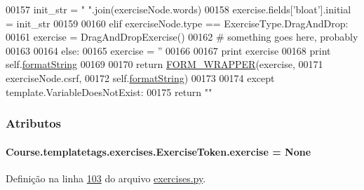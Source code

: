 \begin{DoxyCode}
00157                 init\_str = \textcolor{stringliteral}{" "}.join(exerciseNode.words)
00158                 exercise.fields[\textcolor{stringliteral}{'bloat'}].initial = init\_str
00159 
00160             \textcolor{keywordflow}{elif} exerciseNode.type == ExerciseType.DragAndDrop:
00161                 exercise = DragAndDropExercise()
00162                 \textcolor{comment}{# something goes here, probably}
00163 
00164             \textcolor{keywordflow}{else}:
00165                 exercise = \textcolor{stringliteral}{''}
00166 
00167             \textcolor{keywordflow}{print} exercise
00168             \textcolor{keywordflow}{print} self.\hyperlink{classCourse_1_1templatetags_1_1exercises_1_1ExerciseToken_ae15b200ce6e26966169799ea67b67bcd}{formatString}
00169 
00170             \textcolor{keywordflow}{return} \hyperlink{namespaceCourse_1_1macros_a39e2016892066b4da954490ccc32533e}{FORM\_WRAPPER}(exercise, 
00171                                 exerciseNode.csrf, 
00172                                 self.\hyperlink{classCourse_1_1templatetags_1_1exercises_1_1ExerciseToken_ae15b200ce6e26966169799ea67b67bcd}{formatString})
00173 
00174         \textcolor{keywordflow}{except} template.VariableDoesNotExist:
00175             \textcolor{keywordflow}{return} \textcolor{stringliteral}{""}\end{DoxyCode}


\subsubsection{Atributos}
\hypertarget{classCourse_1_1templatetags_1_1exercises_1_1ExerciseToken_a7051cf9758ec633ad62d57161d73c852}{}
\paragraph[{exercise}]{\setlength{\rightskip}{0pt plus 5cm}Course.\+templatetags.\+exercises.\+Exercise\+Token.\+exercise = None\hspace{0.3cm}{\ttfamily [static]}}\label{classCourse_1_1templatetags_1_1exercises_1_1ExerciseToken_a7051cf9758ec633ad62d57161d73c852}


Definição na linha \hyperlink{exercises_8py_source_l00103}{103} do arquivo \hyperlink{exercises_8py_source}{exercises.\+py}.



